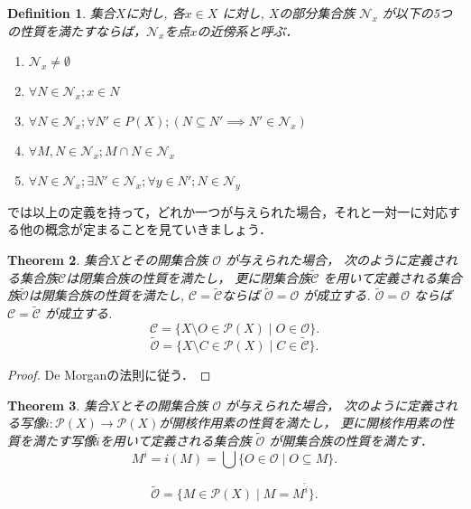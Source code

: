 \documentclass[lualatex]{ltjsbook}
\newtheorem{theorem}{Theorem}[section]
\newtheorem{definition}[theorem]{Definition}
\theoremstyle{remark}
\theoremstyle{plain}
\begin{document}
\begin{definition}
	集合$X$に対し, 各$x \in X$ に対し, $X$の部分集合族 $\mathcal{N}_x$ が以下の5つの性質を満たすならば，$\mathcal{N}_x$を点$x$の近傍系と呼ぶ．
	\begin{enumerate}
		\item $\mathcal{N}_x \neq \emptyset$
		\item $ \forall N \in \mathcal{N}_x; x \in N$
		\item $ \forall N \in \mathcal{N}_x; \forall N' \in P(X); \left( N \subseteq N' \implies N' \in \mathcal{N}_x \right) $ 
		\item $\forall M, N \in \mathcal{N}_x ; M  \cap N \in \mathcal{N}_x $ 
		\item $\forall N \in \mathcal{N}_x; \exists N' \in \mathcal{N}_x ; \forall y \in N'; N \in \mathcal{N}_y$
	\end{enumerate}
\end{definition}
 \newpage
では以上の定義を持って，どれか一つが与えられた場合，それと一対一に対応する他の概念が定まることを見ていきましょう．

\begin{theorem}
集合$X$とその開集合族 $\mathcal{O}$ が与えられた場合，
次のように定義される集合族$\mathcal{C}$は閉集合族の性質を満たし，
更に閉集合族$\tilde{\mathcal{C}}$ を用いて定義される集合族$\tilde{\mathcal{O}}$は開集合族の性質を満たし,
$\mathcal{C} = \tilde{\mathcal{C}}$ならば $\tilde{\mathcal{O}} = \mathcal{O}$  が成立する. $\tilde{\mathcal{O}} = \mathcal{O}$ ならば $\mathcal{C} = \tilde{\mathcal{C}}$ が成立する.
	 \[
	\mathcal{C} = \{X \setminus O \in \mathcal{P}(X) \mid O \in \mathcal{O} \} 
	.\] 
	\[
		\tilde{\mathcal{O}} = \{ X \setminus C \in \mathcal{P}(X)  \mid C \in \tilde{\mathcal{C}} \} 
	.\] 
\end{theorem}

\begin{proof}
	De Morganの法則に従う．	
\end{proof}

\begin{theorem}
	集合$X$とその開集合族 $\mathcal{O}$ が与えられた場合，
	次のように定義される写像$i: \mathcal{P}(X) \to  \mathcal{P}(X)$が開核作用素の性質を満たし，
	更に開核作用素の性質を満たす写像$\tilde{i}$を用いて定義される集合族 $\tilde{\mathcal{O}}$ が開集合族の性質を満たす．
	\[
	M^{i}= i(M) = \bigcup \{O \in \mathcal{O} \mid O \subseteq M\} 
	.\] 

	\[
		\tilde{\mathcal{O}} =\{ M \in \mathcal{P}(X) \mid M = M^{\tilde{i}}\} 
	.\] 
\end{theorem}
\end{document}
